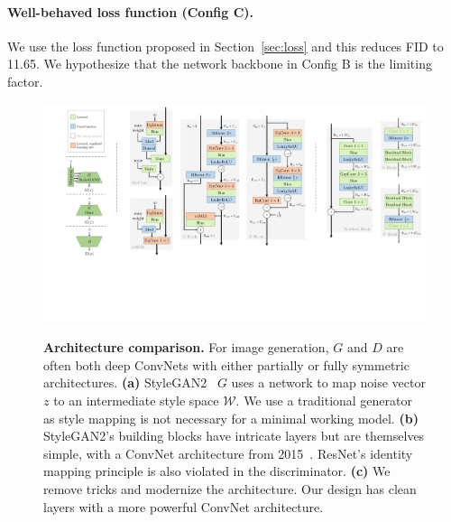 
\vspace{-0.3cm}
\paragraph{Well-behaved loss function (Config C).}
We use the loss function proposed in Section~\ref{sec:loss} and this reduces FID to 11.65. We hypothesize that the network backbone in Config B is the limiting factor. 


\begin{figure}[t]%
\centering\footnotesize%
 \includegraphics[width=\linewidth,clip,trim={3.5cm 11.5cm 0cm 0cm}]{figures/arch.pdf}\\%
\hfill%
\hfill%
\hfill%
\vspace{0.5mm}
\caption{\label{fig:network}%
\textbf{Architecture comparison.}
For image generation, $G$ and $D$ are often both deep ConvNets with either partially or fully symmetric architectures.
\textbf{(a)}
StyleGAN2~\cite{sg2} $G$ uses a network to map noise vector $z$ to an intermediate style space $\mathcal{W}$. We use a traditional generator as style mapping is not necessary for a minimal working model.
\textbf{(b)}
StyleGAN2's building blocks have intricate layers but are themselves simple, with a ConvNet architecture from 2015~\cite{alexnet,vgg,resnet}. ResNet's identity mapping principle is also violated in the discriminator.
\textbf{(c)}
We remove tricks and modernize the architecture. Our design has clean layers with a more powerful ConvNet architecture.
}%
\vspace{-0.3cm}%
\end{figure}

